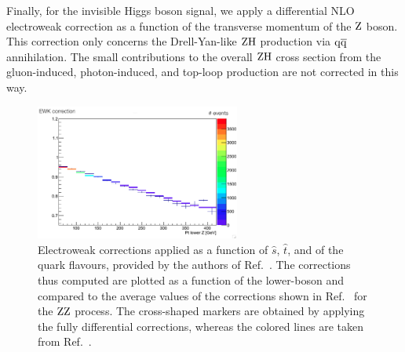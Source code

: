 Finally, for the invisible Higgs boson signal, we apply a differential NLO electroweak correction as a function of the transverse momentum of the $\mathrm{Z}$ boson.
This correction only concerns the Drell-Yan-like $\mathrm{Z}\mathrm{H}$ production via $\mathrm{q}\mathrm{\overline{q}}$ annihilation.
The small contributions to the overall $\mathrm{Z}\mathrm{H}$ cross section from the gluon-induced, photon-induced, and top-loop production are not corrected in this way.

\begin{figure}[htbp]
\centering
\includegraphics[width=0.60\textwidth]{figures/ZZ_ewkCorr.png}
\caption{Electroweak corrections applied as a function of $\hat{s}$, 
  $\hat{t}$, and of the quark flavours, provided by the authors of 
  Ref.~\cite{Bierweiler:2013dja}. The corrections thus computed are
  plotted as a function of the lower-boson \pt and compared to the
  average values of the corrections shown in Ref.~\cite{Bierweiler:2013dja} 
  for the $\mathrm{Z}\mathrm{Z}$ process. The cross-shaped markers are obtained by
  applying the fully differential corrections, whereas the colored
  lines are taken from Ref.~\cite{Bierweiler:2013dja}.} 
\label{fig:ewkCorrectionCompare}
\end{figure}



